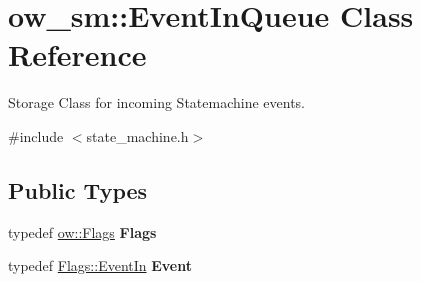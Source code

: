 \hypertarget{classow__sm_1_1EventInQueue}{}\section{ow\+\_\+sm\+:\+:Event\+In\+Queue Class Reference}
\label{classow__sm_1_1EventInQueue}


Storage Class for incoming Statemachine events.  




{\ttfamily \#include $<$state\+\_\+machine.\+h$>$}

\subsection*{Public Types}
\begin{DoxyCompactItemize}
\item 
typedef \hyperlink{classow__core_1_1Flags}{ow\+::\+Flags} {\bfseries Flags}\hypertarget{classow__sm_1_1EventInQueue_aaff1c33e10e0ef8055f1f558196d5d24}{}\label{classow__sm_1_1EventInQueue_aaff1c33e10e0ef8055f1f558196d5d24}

\item 
typedef \hyperlink{classow__core_1_1Flags_a97da2cfc7e3e4b51aac33116f914bd2b}{Flags\+::\+Event\+In} {\bfseries Event}\hypertarget{classow__sm_1_1EventInQueue_a3da2e129a4ac880d6eeef55aaf4b3833}{}\label{classow__sm_1_1EventInQueue_a3da2e129a4ac880d6eeef55aaf4b3833}

\end{DoxyCompactItemize}
